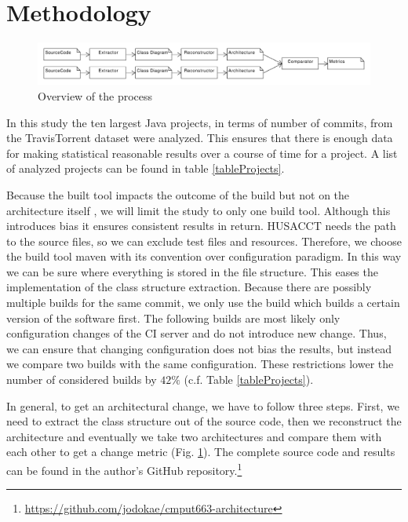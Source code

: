 \documentclass[conference]{IEEEtran}
\begin{document}
\section{Methodology}

\begin{figure}[!t]
	\centering
	\includegraphics[width=7in]{assets/overview.pdf}
	\caption{Overview of the process}
	\label{overview}
\end{figure}



In this study the ten largest Java projects, in terms of number of commits, from the TravisTorrent dataset were analyzed. This ensures that there is enough data for making statistical reasonable results over a course of time for a project. A list of analyzed projects can be found in table \ref{tableProjects}.

Because the built tool impacts the outcome of the build but not on the architecture itself \cite{FailsCorr}, we will limit the study to only one build tool. Although this introduces bias it ensures consistent results in return. HUSACCT needs the path to the source files, so we can exclude test files and resources. Therefore, we choose the build tool maven  with its convention over configuration paradigm. In this way we can be sure where everything is stored in the file structure. This eases the implementation of the class structure extraction. 
Because there are possibly multiple builds for the same commit, we only use the build which builds a certain version of the software first. The following builds are most likely only configuration changes of the CI server and do not introduce new change. Thus, we can ensure that changing configuration does not bias the results, but instead we compare two builds with the same configuration. These restrictions lower the number of considered builds by $42\%$ (c.f. Table \ref{tableProjects}). 

In general, to get an architectural change, we have to follow three steps. First, we need to extract the class structure out of the source code, then we reconstruct the architecture and eventually we take two architectures and compare them with each other to get a change metric (Fig. \ref{overview}). The complete source code and results can be found in the author's GitHub repository.\footnote{\url{https://github.com/jodokae/cmput663-architecture}}
\end{document}
